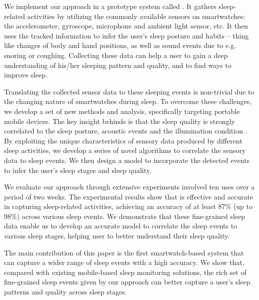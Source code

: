 We implement our approach in a prototype system called \systemname. It gathers sleep-related activities by utilizing the commonly available
sensors on smartwatches: the accelerometer, gyroscope, microphone and ambient light sensor, etc. It then uses the tracked information to
infer the user's sleep posture and habits -- thing like changes of body and hand positions, as well as sound events due to e.g. snoring or
coughing.  Collecting these data can help a user to gain a deep understanding of his/her sleeping pattern and quality, and to find ways to
improve sleep. 

Translating the collected sensor data to these sleeping events is non-trivial due to the changing nature of smartwatches during sleep. To
overcome these challenges, we develop a set of new methods and analysis, specifically targeting portable mobile devices.  The key insight
behinds {\systemname} is that the sleep quality is strongly correlated to the sleep posture, acoustic events and the illumination condition
\cite{shelgikar2016sleep}. By exploiting the unique characteristics of sensory data produced by different sleep activities, we develop a
series of novel algorithms to correlate the sensory data to sleep events. We then design a model to incorporate the detected events to
infer the user's sleep stages and sleep quality. 

 We evaluate our approach through extensive experiments involved ten uses over a period of two weeks. The experimental results
show that {\systemname} is effective and accurate in capturing sleep-related activities, achieving an accuracy of at least 87\% (up to
98\%) across various sleep events. We demonstrate that these fine-grained sleep data enable us to develop an accurate model to correlate
the sleep events to various sleep stages, helping user to better understand their sleep quality. 

The main contribution of this paper is the first smartwatch-based system that can capture a wider range of sleep events with a high
accuracy. We show that, compared with existing mobile-based sleep monitoring solutions, the rich set of fine-grained sleep events given by
our approach can better capture a user's sleep patterns and quality across sleep stages.
